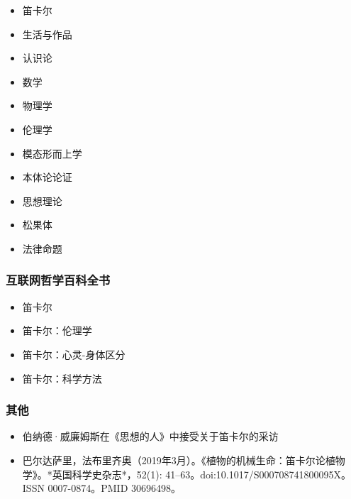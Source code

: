 \begin{itemize}
\item 笛卡尔
\item 生活与作品
\item 认识论
\item 数学
\item 物理学
\item 伦理学
\item 模态形而上学
\item 本体论论证
\item 思想理论
\item 松果体
\item 法律命题
\end{itemize}
\subsubsection{互联网哲学百科全书}
\begin{itemize}
\item 笛卡尔
\item 笛卡尔：伦理学
\item 笛卡尔：心灵-身体区分
\item 笛卡尔：科学方法
\end{itemize}
\subsubsection{其他}
\begin{itemize}
\item 伯纳德·威廉姆斯在《思想的人》中接受关于笛卡尔的采访
\item 巴尔达萨里，法布里齐奥（2019年3月）。《植物的机械生命：笛卡尔论植物学》。*英国科学史杂志*，52(1): 41–63。doi:10.1017/S000708741800095X。ISSN 0007-0874。PMID 30696498。
\end{itemize}